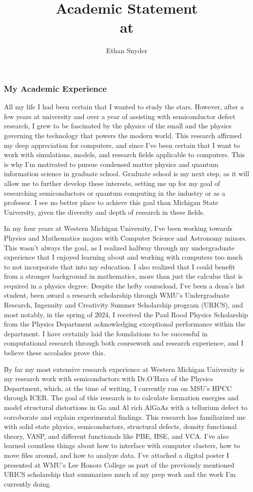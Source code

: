 \documentclass[11pt]{article}
\title{Academic Statement\\
	\large \dept{} at \school{}}
\author{Ethan Snyder}
\newcommand{\school}{Michigan State University}
\begin{document}
\maketitle
\subsubsection*{My Academic Experience}
All my life I had been certain that I wanted to study the stars. However, after a few years at university and over a year of assisting with semiconductor defect research, I grew to be fascinated by the physics of the small and the physics governing the technology that powers the modern world. This research affirmed my deep appreciation for computers, and since I've been certain that I want to work with simulations, models, and research fields applicable to computers. This is why I'm motivated to pursue condensed matter physics and quantum information science in graduate school. Graduate school is my next step, as it will allow me to further develop these interests, setting me up for my goal of researching semiconductors or quantum computing in the industry or as a professor. I see no better place to achieve this goal than \school{}, given the diversity and depth of research in these fields.

In my four years at Western Michigan University, I've been working towards Physics and Mathematics majors with Computer Science and Astronomy minors. This wasn't always the goal, as I realized halfway through my undergraduate experience that I enjoyed learning about and working with computers too much to not incorporate that into my education. I also realized that I could benefit from a stronger background in mathematics, more than just the calculus that is required in a physics degree. Despite the hefty courseload, I've been a dean's list student, been award a research scholarship through WMU's Undergraduate Research, Ingenuity and Creativity Summer Scholarship program (URICS), and most notably, in the spring of 2024, I received the Paul Rood Physics Scholarship from the Physics Department acknowledging exceptional performance within the department. I have certainly laid the foundations to be successful in computational research through both coursework and research experience, and I believe these accolades prove this.

By far my most extensive research experience at Western Michigan University is my research work with semiconductors with Dr.\@ O'Hara of the Physics Department, which, at the time of writing, I currently run on MSU's HPCC through ICER. The goal of this research is to calculate formation energies and model structural distortions in Ga and Al rich AlGaAs with a tellurium defect to corroborate and explain experimental findings. This research has familiarized me with solid state physics, semiconductors, structural defects, density functional theory, VASP, and different functionals like PBE, HSE, and VCA. I've also learned countless things about how to interface with computer clusters, how to move files around, and how to analyze data. I've attached a digital poster I presented at WMU's Lee Honors College as part of the previously mentioned URICS scholarship that summarizes much of my prep work and the work I'm currently doing.
\end{document}
